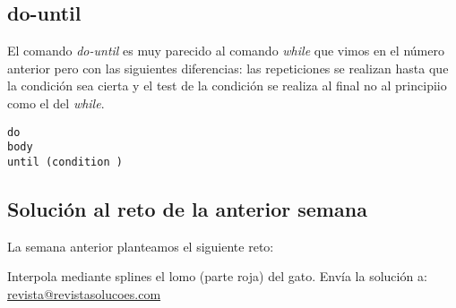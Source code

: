 \subsection{do-until}

El comando \textit{do-until} es muy parecido al comando \textit{while} que vimos en el número anterior pero con las siguientes diferencias: las repeticiones se realizan hasta que la condición sea cierta y el test de la condición se realiza al final no al principiio como el del \textit{while}.
\begin{octavebox}
\begin{verbatim}
do
body
until (condition )
\end{verbatim}
\end{octavebox}


\subsection{Solución al reto de la anterior semana}

La semana anterior planteamos el siguiente reto:

\begin{mybox}

   \begin{center}\scalebox{0.64}{}\end{center}
Interpola mediante splines el lomo (parte roja) del gato.
  Envía la solución a: \url{revista@revistasolucoes.com}
    
\end{mybox}

